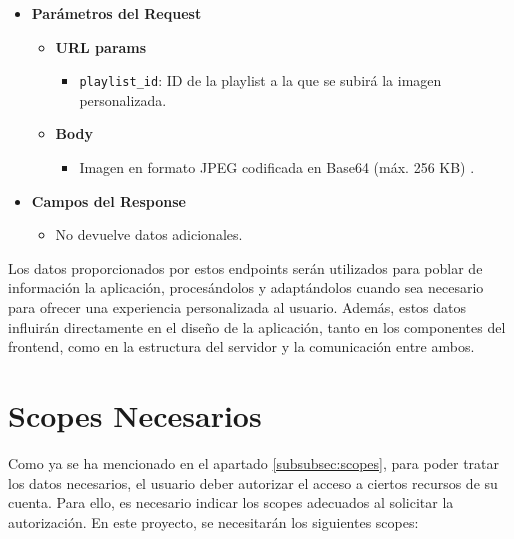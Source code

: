 \begin{itemize}
    \item \textbf{Parámetros del Request}
          \begin{itemize}
              \item \textbf{URL params}
                    \begin{itemize}
                        \item \texttt{playlist\_id}: ID de la playlist a la que se subirá la imagen personalizada.
                    \end{itemize}
              \item \textbf{Body}
                    \begin{itemize}
                        \item Imagen en formato JPEG codificada en Base64 (máx. 256 KB) .
                    \end{itemize}
          \end{itemize}
    \item \textbf{Campos del Response}
          \begin{itemize}
              \item No devuelve datos adicionales.
          \end{itemize}
\end{itemize}

Los datos proporcionados por estos endpoints serán utilizados para poblar de información la aplicación, procesándolos y adaptándolos cuando sea necesario para ofrecer una experiencia personalizada al usuario. Además, estos datos influirán directamente en el diseño de la aplicación, tanto en los componentes del frontend, como en la estructura del servidor y la comunicación entre ambos.

\section{Scopes Necesarios}

Como ya se ha mencionado en el apartado \ref{subsubsec:scopes}, para poder tratar los datos necesarios, el usuario deber autorizar el acceso a ciertos recursos de su cuenta. Para ello, es necesario indicar los scopes adecuados al solicitar la autorización. En este proyecto, se necesitarán los siguientes scopes:

